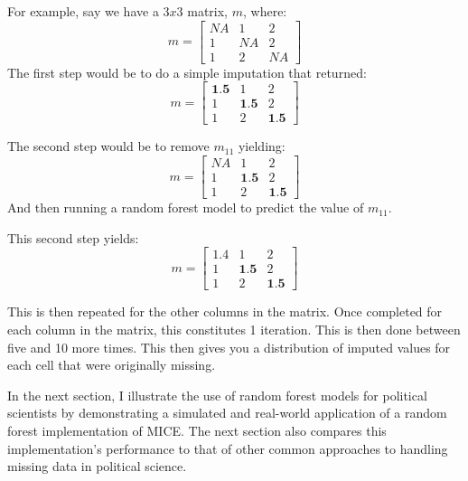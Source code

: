 \documentclass [12pt]{article}
\begin{document}
For example, say we have a $3x3$ matrix, $m$, where:
\begin{equation*}
m = 
\begin{bmatrix}
	NA & 1 & 2 \\
	1 & NA & 2 \\
	1 & 2 & NA	
\end{bmatrix}
\end{equation*}
 The first step  would be to do a simple imputation that returned: 
 \begin{equation*}
 	m = \begin{bmatrix}
 		\textbf{1.5} & 1 & 2 \\
 		1 & \textbf{1.5} & 2 \\
 		1 & 2 & \textbf{1.5}
 		\end{bmatrix}	
 \end{equation*}

The second step would be to remove $m_{11}$ yielding:
\begin{equation*}
	m = 
	\begin{bmatrix}
		NA & 1 & 2 \\
		1 & \textbf{1.5} & 2 \\
		1 & 2 & \textbf{1.5}
	\end{bmatrix}
\end{equation*}
And then running a random forest model to predict the value of $m_{11}$.

This second step yields:
\begin{equation*}
	m = \begin{bmatrix}
 	1.4 & 1 & 2 \\
 	1 & \textbf{1.5} & 2 \\
 	1 & 2 & \textbf{1.5}	
 \end{bmatrix}
\end{equation*}

This is then repeated for the other columns in the matrix. Once completed for each column in the matrix, this constitutes 1 iteration. This is then done between five and 10 more times. This then gives you a distribution of imputed values for each cell that were originally missing. 
 
In the next section, I illustrate the use of random forest models for political scientists by demonstrating a simulated and real-world application of a random forest implementation of MICE. The next section also compares this implementation's performance to that of other common approaches to handling missing data in political science. 
\end{document}
